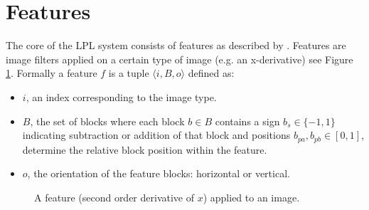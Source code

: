 \documentclass[a4paper,11pt]{article}
\begin{document}
\section{Features} \label{sec:feat}
The core of the LPL system consists of features as described by
\cite{dlagnekov_thesis, zhang,naturaltext}. Features are image filters applied
on a certain type of image (e.g. an x-derivative) see Figure \ref{fig:feature}.
Formally a feature $f$ is a tuple $\langle i, B, o \rangle$ defined as:
\begin{itemize}
	\item{$i$, an index corresponding to the image type.}
	\item{$B$, the set of blocks where each block $b \in B$ contains a sign
	$b_s \in \{-1,1\}$ indicating subtraction or addition of that block and
	positions $b_{pa},b_{pb} \in [0,1]$, determine the relative block position
	within the feature.}
	\item{$o$, the orientation of the feature blocks: horizontal or vertical.}
\end{itemize}
\begin{figure}[!ht]
\centering
{}
\caption{A feature (second order derivative of $x$) applied to an image.}
\label{fig:feature}
\end{figure}
\end{document}
